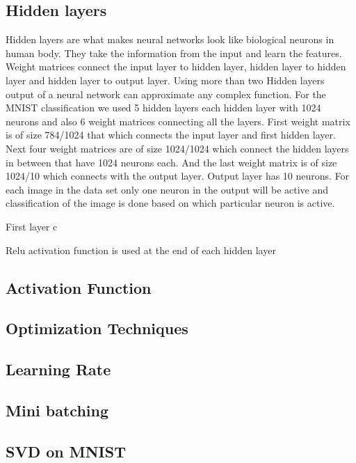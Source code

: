 {\subsection{Hidden layers} 

Hidden layers are what makes neural networks look like biological neurons in
human body. They take the information from the input and learn the features.
Weight matrices connect the input layer to hidden layer, hidden layer to hidden
layer and hidden layer to output layer. Using more than two Hidden layers output
of a neural network can approximate any complex function. For the MNIST
classification we used 5 hidden layers each hidden layer with 1024 neurons and
also 6 weight matrices connecting all the layers. First weight matrix is of size
784/1024 that which connects the input layer and first hidden layer. Next four
weight matrices are of size 1024/1024 which connect the hidden layers in between
that have 1024 neurons each. And the last weight matrix is of size 1024/10 which
connects with the output layer. Output layer has 10 neurons. For each image in
the data set only one neuron in the output will be active and classification of
the image is done based on which particular neuron is active.

First layer c

 Relu activation function is used at the end of each hidden
layer


\subsection{Activation Function}

\subsection{Optimization Techniques}

\subsection{Learning Rate}

\subsection{Mini batching}

\subsection{}

\subsection{SVD on MNIST}




}
